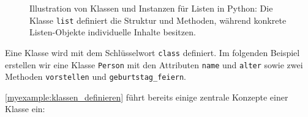 \begin{figure}[H]
{}
\caption{Illustration von Klassen und Instanzen für Listen in Python: Die Klasse \texttt{list} definiert die Struktur und Methoden, während konkrete Listen-Objekte individuelle Inhalte besitzen.}
\label{fig:listen-in-python}
\end{figure}


\begin{myexample}\label{myexample:klassen_definieren}
Eine Klasse wird mit dem Schlüsselwort \lstinline|class| definiert. Im folgenden Beispiel erstellen wir eine Klasse \lstinline|Person| mit den Attributen \lstinline|name| und \lstinline|alter| sowie zwei Methoden \lstinline|vorstellen| und \lstinline|geburtstag_feiern|.


\end{myexample}

\cref{myexample:klassen_definieren} führt bereits einige zentrale Konzepte einer Klasse ein:

